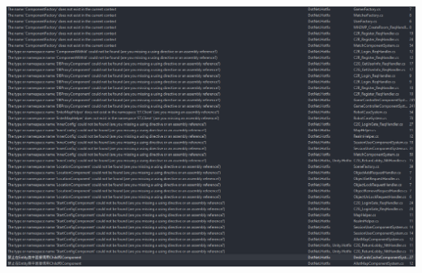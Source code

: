 \documentclass[9pt, b5paper]{article}
\begin{document}
\begin{center}
\includegraphics[width=.9\linewidth]{./pic/et4_20230616_165750.png}
\end{center}
\end{document}
